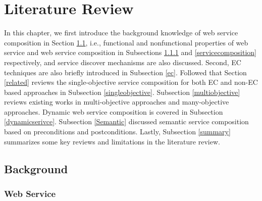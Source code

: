 \chapter{Literature Review}\label{C:review}
In this chapter, we first introduce the background knowledge of web service composition in Section \ref{background}, i.e., functional and nonfunctional properties of web service and web service composition in Subsections \ref{service} and \ref{servicecomposition} respectively, and service discover mechanisms are also discussed. Second, EC techniques are also briefly introduced in Subsection \ref{ec}. Followed that Section \ref{related} reviews the single-objective service composition for both EC and non-EC based approaches in Subsection \ref{singleobjective}.  Subsection  \ref{multiobjective} reviews existing works in multi-objective approaches and many-objective approaches.  Dynamic web service composition is covered in Subsection \ref{dynamicserivce}. Subsection \ref{Semantic}  discussed semantic service composition based on preconditions and postconditions. Lastly, Subsection \ref{summary} summarizes some key reviews and limitations in the literature review.
\section{Background}\label{background}
\subsection{Web Service}\label{service}

